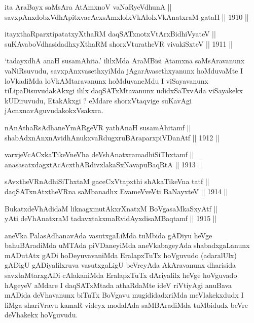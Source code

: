 
\begin{shl}
ita AraBayx saMsAra AtAmxnoV vaNaRyeV\s dhunA ||  \\
savxpAnxdobxVdhApitxvacAcxsAmxlolxVkAlolxVkAnatxraM gataH ||  1910 ||  
\end{shl}

\begin{shl}
itayxthaRparxtipatatxyXthaRM daqSATxnotxV\s tArxBidhiVyateV || \\
suKAvaboVdhasidadhxyXthaRM shorxVturatheVR vivakiSxteV ||  1911 ||  
\end{shl}

\begin{artha}
`tadayxdhA anaH susamAhita.' ililxMda AraMBisi Atamxna saMsAravanunx vaNiRsuvudu,
savxpAnxvasethxyiMda jAgarAvasethxyanunx hoMduvaMte I loVkadiMda
loVkAMtaravanunx hoMduvaneMdu I viSayavanunx tiLipaDisuvudakAkxgi
ililx daqSATxMtavanunx udidxSaTxvAda viSayakekx kUDiruvudu,
EtakAkxgi ? eMdare shorxVtaqvige suKavAgi jAcnxnavAguvudakokxVsakxra.
\end{artha}


\begin{shl}
nAnAthaRsAdhaneYmARgeVR yathA\s naH susamAhitamf || \\
shabAdxnAnxnAvidhAnukxvaRdugxruBAraparxpiVDanAtf ||  1912 ||  
\end{shl}

\begin{shl}
varxjeVcACxkaTikeVneVha deVshAnatxramadhiSiThxtamf || \\
anasasatxdagxtAcAcxthARdivxlakaSxNavapuBaqRtA ||  1913 ||  
\end{shl}

\begin{shl}
sAvxtheVRnAdhiSiThxtaM gaceCxVtapxthi shAkaTikeVna tatf || \\
daqSATxnAtxtheVRna saMbanadhx EvameVveVti BaNayxteV ||  1914 ||  
\end{shl}

\begin{shl}
BukatxdeVhAdidaM liknagxmutAkxrXnatxM BoVgasaMkaSxyAtf || \\
yAti deVhAnatxraM tadavxtakxmaRvidAyxdisaMBaqtamf ||  1915 ||  
\end{shl}

\begin{artha}
aneVka PalasAdhanavAda vasutxgaLiMda tuMbida gADiyu heVge
bahuBAradiMda uMTAda piVDaneyiMda aneVkabageyAda shabadxgaLanunx
mADutAtx gADi hoDeyuvavaniMda EralapxTuTx hoVguvudo (adaralUlx) gADigU
gADiyalilxruva vasutxgaLigU beVreyAda AkAravanunx dharisida
savxtaMtarxgADi cAlakaniMda EralapxTuTx dAriyalilx heVge hoVguvado
hAgeyeV aMdare I daqSATxMtada athaRdaMte ideV riVtiyAgi anuBava mADida
deVhavanunx biTuTx BoVgavu mugididadxriMda meVlakekxdudx I liMga
shariVravu kamaR videyx modalAda saMBAradiMda tuMbidudx beVre
deVhakekx hoVguvudu.
\end{artha}

